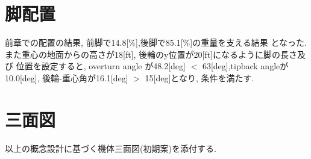 \documentclass[class=article, crop=false, dvipdfmx, fleqn]{standalone}
\begin{document}
\section{脚配置}
前章での配置の結果, 前脚で14.8[$\%$],後脚で85.1[$\%$]の重量を支える結果
となった.
また重心の地面からの高さが18[ft], 後輪のy位置が20[ft]になるように脚の長さ及び
位置を設定すると,
overturn angle が48.2[deg] $<$ 63[deg],tipback angleが10.0[deg],
後輪-重心角が16.1[deg] $>$ 15[deg]となり, 条件を満たす.

\section{三面図}
以上の概念設計に基づく機体三面図(初期案)を添付する.
\end{document}
